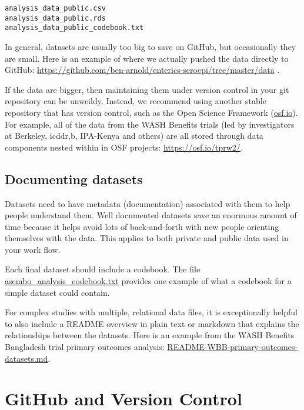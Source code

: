 \documentclass[]{book}
\begin{document}
\begin{verbatim}
analysis_data_public.csv
analysis_data_public.rds
analysis_data_public_codebook.txt
\end{verbatim}

In general, datasets are usually too big to save on GitHub, but occasionally they are small. Here is an example of where we actually pushed the data directly to GitHub: \url{https://github.com/ben-arnold/enterics-seroepi/tree/master/data} .

If the data are bigger, then maintaining them under version control in your git repository can be unweildy. Instead, we recommend using another stable repository that has version control, such as the Open Science Framework (\href{https://osf.io}{osf.io}). For example, all of the data from the WASH Benefits trials (led by investigators at Berkeley, icddr,b, IPA-Kenya and others) are all stored through data components nested within in OSF projects: \url{https://osf.io/tprw2/}.

\hypertarget{documenting-datasets}{%
\section{Documenting datasets}\label{documenting-datasets}}

Datasets need to have metadata (documentation) associated with them to help people understand them. Well documented datasets save an enormous amount of time because it helps avoid lots of back-and-forth with new people orienting themselves with the data. This applies to both private and public data used in your work flow.

Each final dataset should include a codebook. The file \href{https://github.com/ben-arnold/enterics-seroepi/blob/master/data/asembo_analysis_codebook.txt}{asembo\_analysis\_codebook.txt} provides one example of what a codebook for a simple dataset could contain.

For complex studies with multiple, relational data files, it is exceptionally helpful to also include a README overview in plain text or markdown that explains the relationships between the datasets. Here is an example from the WASH Benefits Bangladesh trial primary outcomes analysis: \href{https://osf.io/v3nfs/}{README-WBB-primary-outcomes-datasets.md}.

\hypertarget{github}{%
\chapter{GitHub and Version Control}\label{github}}
\end{document}
